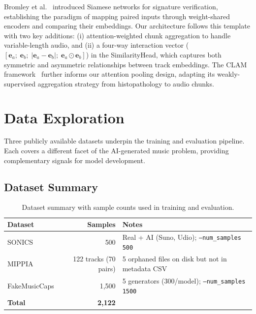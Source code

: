 \documentclass[11pt,a4paper]{article}
\begin{document}
Bromley et al.~\cite{B4} introduced Siamese networks for signature verification, establishing the paradigm of mapping paired inputs through weight-shared encoders and comparing their embeddings. Our architecture follows this template with two key additions: (i) attention-weighted chunk aggregation to handle variable-length audio, and (ii) a four-way interaction vector ($[\mathbf{e}_a;\; \mathbf{e}_b;\; |\mathbf{e}_a - \mathbf{e}_b|;\; \mathbf{e}_a \odot \mathbf{e}_b]$) in the SimilarityHead, which captures both symmetric and asymmetric relationships between track embeddings. The CLAM framework~\cite{A4} further informs our attention pooling design, adapting its weakly-supervised aggregation strategy from histopathology to audio chunks.


\section{Data Exploration}
\label{sec:data-exploration}

Three publicly available datasets underpin the training and evaluation pipeline. Each covers a different facet of the AI-generated music problem, providing complementary signals for model development.

\subsection{Dataset Summary}

\begin{table}[H]
\centering
\begin{tabular}{lrl}
\toprule
\textbf{Dataset} & \textbf{Samples} & \textbf{Notes} \\
\midrule
SONICS & 500 & Real + AI (Suno, Udio); \texttt{--num\_samples 500} \\
MIPPIA & 122 tracks (70 pairs) & 5 orphaned files on disk but not in metadata CSV \\
FakeMusicCaps & 1,500 & 5 generators (300/model); \texttt{--num\_samples 1500} \\
\midrule
\textbf{Total} & \textbf{2,122} & \\
\bottomrule
\end{tabular}
\caption{Dataset summary with sample counts used in training and evaluation.}
\label{tab:dataset-summary}
\end{table}
\end{document}
